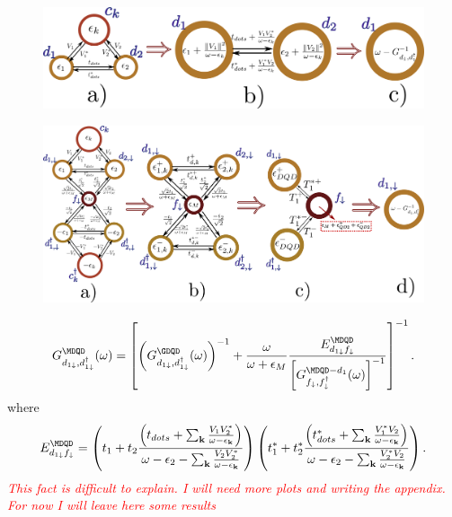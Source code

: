 \documentclass[showpacs,aps,prb,reprint,superscriptaddress]{revtex4-1}
\newcommand{\Jesus}[1]{\textcolor{red}{\fbox{Jesus} {\sl#1}}}
\begin{document}
 
\begin{widetext}



\begin{figure}[bt]
\begin{center}
\includegraphics[scale=0.4]{Graficos/Graph_DQD-Pro.png}
\caption{ 
}
%
\label{fig:GenModel}
\end{center}
\end{figure}



\begin{figure}[bt]
\begin{center}
\includegraphics[scale=0.4]{Graficos/Graphs-DQD-M-Pro.png}
\caption{ 
}
%
\label{fig:GenModel}
\end{center}
\end{figure}


\begin{equation}
    \GreenG{d_{1\downarrow},d_{1\downarrow}^{\dagger}}{\MDQD}=\left[\left(\GreenG{d_{1\downarrow},d_{1\downarrow}^{\dagger}}{\GDQD } \right)^{-1}+\frac{\omega}{\omega+\epsilon_{M}}\frac{E_{d_{1\dw}f_{\dw}}^{\MDQD}}{\left[\GreenG{f_{\downarrow},f_{\downarrow}^{\dagger}}{\MDQD-d_{1}}\right]^{-1}}\right]^{-1}.
\end{equation}
where 
\begin{equation}
    E_{d_{1\dw}f_{\dw}}^{\MDQD}=\left(t_{1}+t_{2}\frac{\left(t_{dots}+\sum_{\mathbf{k}}\frac{V_{1}V_{2}^{*}}{\omega-\epsilon_{\mathbf{k}}}\right)}{\omega-\epsilon_{2}-\sum_{\mathbf{k}}\frac{V_{2}V_{2}^{*}}{\omega-\epsilon_{\mathbf{k}}}}\right)\left(t_{1}^{*}+t_{2}^{*}\frac{\left(t_{dots}^{*}+\sum_{\mathbf{k}}\frac{V_{1}^{*}V_{2}}{\omega-\epsilon_{\mathbf{k}}}\right)}{\omega-\epsilon_{2}-\sum_{\mathbf{k}}\frac{V_{2}^{*}V_{2}}{\omega-\epsilon_{\mathbf{k}}}}\right).
\end{equation}
\Jesus{This fact is difficult to explain. I will need more plots and writing the appendix. For now I will leave here some results}




\end{widetext}
\end{document}
